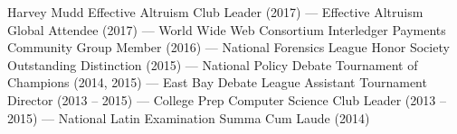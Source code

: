 \documentclass[10pt]{article}
\renewcommand{\section}[2]%
        {\pagebreak[3]\vspace{1.3\baselineskip}%
         \phantomsection\addcontentsline{toc}{section}{#1}%
         \hspace{0in}%
         \marginpar{
         \raggedright \small \scshape #1}#2}
\newcommand{\blankline}{\quad\pagebreak[2]\vspace{-0.3\baselineskip}}
\providecommand*\email[1]{\href{mailto:#1}{#1}}
\begin{document}
  \blankline

  Harvey Mudd Effective Altruism Club Leader (2017) --- Effective Altruism Global Attendee (2017) --- World Wide Web Consortium Interledger Payments Community Group Member (2016) --- National Forensics League Honor Society Outstanding Distinction (2015) --- National Policy Debate Tournament of Champions (2014, 2015) --- East Bay Debate League Assistant Tournament Director (2013 -- 2015) --- College Prep Computer Science Club Leader (2013 -- 2015) --- National Latin Examination Summa Cum Laude (2014)


\end{document}
